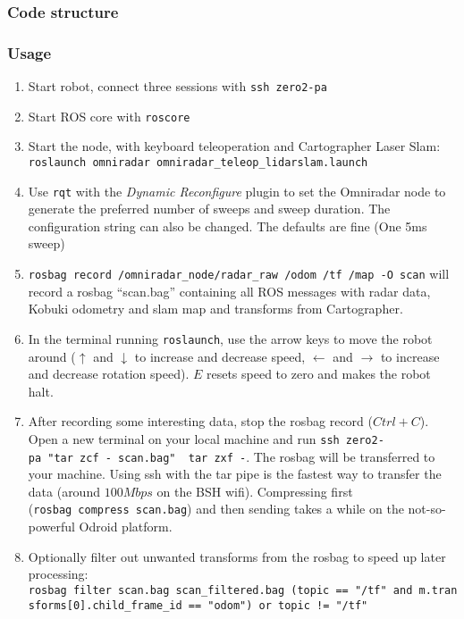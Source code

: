 \subsubsection{Code structure}\label{code-structure}

\subsubsection{Usage}\label{usage}

\begin{enumerate}
\def\labelenumi{\arabic{enumi}.}
\tightlist
\item
  Start robot, connect three sessions with \texttt{ssh\ zero2-pa}
\item
  Start ROS core with \texttt{roscore}
\item
  Start the node, with keyboard teleoperation and Cartographer Laser
  Slam:
  \texttt{roslaunch\ omniradar\ omniradar\_teleop\_lidarslam.launch}
\item
  Use \texttt{rqt} with the \emph{Dynamic Reconfigure} plugin to set the
  Omniradar node to generate the preferred number of sweeps and sweep
  duration. The configuration string can also be changed. The defaults
  are fine (One 5ms sweep)
\item
  \texttt{rosbag\ record\ /omniradar\_node/radar\_raw\ /odom\ /tf\ /map\ -O\ scan}
  will record a rosbag ``scan.bag'' containing all ROS messages with
  radar data, Kobuki odometry and slam map and transforms from
  Cartographer.
\item
  In the terminal running \texttt{roslaunch}, use the arrow keys to move
  the robot around (\(\uparrow\) and \(\downarrow\) to increase and
  decrease speed, \(\leftarrow\) and \(\rightarrow\) to increase and
  decrease rotation speed). \(E\) resets speed to zero and makes the
  robot halt.
\item
  After recording some interesting data, stop the rosbag record
  (\(Ctrl+C\)). Open a new terminal on your local machine and run
  \texttt{ssh\ zero2-pa\ "tar\ zcf\ -\ scan.bag"\ \textbar{}\ tar\ zxf\ -}.
  The rosbag will be transferred to your machine. Using ssh with the tar
  pipe is the fastest way to transfer the data (around \(100 Mbps\) on
  the BSH wifi). Compressing first (\texttt{rosbag\ compress\ scan.bag})
  and then sending takes a while on the not-so-powerful Odroid platform.
\item
  Optionally filter out unwanted transforms from the rosbag to speed up
  later processing:
  \texttt{rosbag\ filter\ scan.bag\ scan\_filtered.bag\ \textquotesingle{}(topic\ ==\ "/tf"\ and\ m.transforms{[}0{]}.child\_frame\_id\ ==\ "odom")\ or\ topic\ !=\ "/tf"\textquotesingle{}}

\end{enumerate}
